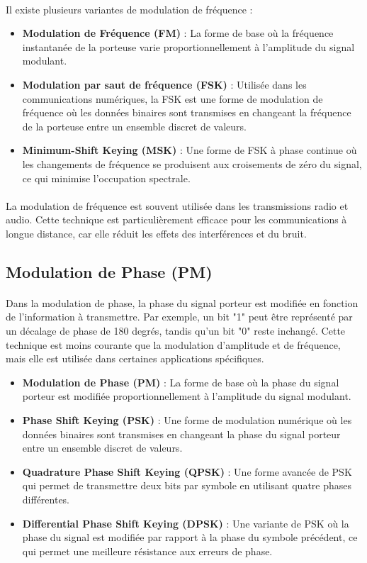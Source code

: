 \documentclass[a4paper,twocolumn]{report}
\begin{document}
\paragraph{}Il existe plusieurs variantes de modulation de fréquence : 
\begin{itemize}
	\item \textbf{Modulation de Fréquence (FM)} :
    La forme de base où la fréquence instantanée de la porteuse varie proportionnellement
    à l'amplitude du signal modulant.
	\item \textbf{Modulation par saut de fréquence (FSK)} :
    Utilisée dans les communications numériques, la FSK est une forme de modulation
    de fréquence où les données binaires sont transmises en changeant
    la fréquence de la porteuse entre un ensemble discret de valeurs.
	\item \textbf{Minimum-Shift Keying (MSK)} : 
    Une forme de FSK à phase continue où les changements de fréquence se produisent
    aux croisements de zéro du signal, ce qui minimise l'occupation spectrale.
\end{itemize}
\paragraph{}La modulation de fréquence est souvent utilisée dans les transmissions
radio et audio. Cette technique est particulièrement efficace pour les communications à longue distance,
car elle réduit les effets des interférences et du bruit.

\subsection{Modulation de Phase (PM)}
\paragraph{}Dans la modulation de phase, la phase du signal porteur est modifiée
en fonction de l'information à transmettre. 
Par exemple, un bit "1" peut être représenté par un décalage de phase de 180 degrés,
tandis qu'un bit "0" reste inchangé. Cette technique est moins courante que la modulation d'amplitude et de fréquence,
mais elle est utilisée dans certaines applications spécifiques.
\begin{itemize}
	\item \textbf{Modulation de Phase (PM)} :
    La forme de base où la phase du signal porteur est modifiée proportionnellement à l'amplitude du signal modulant.
	\item \textbf{Phase Shift Keying (PSK)} : 
    Une forme de modulation numérique où les données binaires sont transmises en
    changeant la phase du signal porteur entre un ensemble discret de valeurs.
	\item \textbf{Quadrature Phase Shift Keying (QPSK)} :
    Une forme avancée de PSK qui permet de transmettre deux bits par symbole en utilisant quatre phases différentes.
	\item \textbf{Differential Phase Shift Keying (DPSK)} :
    Une variante de PSK où la phase du signal est modifiée par rapport à la phase du symbole précédent,
    ce qui permet une meilleure résistance aux erreurs de phase.
\end{itemize}
\end{document}
